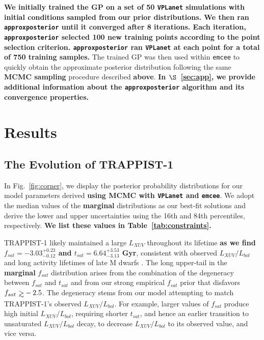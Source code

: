 \documentclass[twocolumn]{aastex62}
\def\gsim{~\rlap{$>$}{\lower 1.0ex\hbox{$\sim$}}}
\newcommand{\xxx}[1]{{\textbf{#1}}}
\newcommand{\vplanet}[0]{\texttt{VPLanet}\xspace}
\newcommand{\emcee}[0]{\texttt{emcee}\xspace}
\newcommand{\approxposterior}[0]{\texttt{approxposterior}\xspace}
\begin{document}
\xxx{We initially trained the GP on a set of 50 \vplanet simulations with initial conditions sampled from our prior distributions. We then ran \approxposterior until it converged after 8 iterations. Each iteration, \approxposterior selected 100 new training points according to the \citet{Kandasamy2017} point selection criterion. \approxposterior ran \vplanet at each point for a total of 750 training samples.} The trained GP was then used within \emcee to quickly obtain the approximate posterior distribution following the same \xxx{MCMC sampling} procedure described \xxx{above}. \xxx{In $\S$~\ref{sec:app}, we provide additional information about the \approxposterior algorithm and its convergence properties.}


\section{Results} \label{sec:results}

\subsection{The Evolution of TRAPPIST-1}

In Fig.~\ref{fig:corner}, we display the posterior probability distributions for our model parameters derived \xxx{using MCMC with \vplanet and \emcee}. We adopt the median values of the \xxx{marginal} distributions as our best-fit solutions and derive the lower and upper uncertainties using the 16th and 84th percentiles, respectively. \xxx{We list these values in Table~\ref{tab:constraints}.}

TRAPPIST-1 likely maintained a large $L_{XUV}$ throughout its lifetime \xxx{as we find $f_{sat} = -3.03^{+0.23}_{-0.12}$ and $t_{sat} = 6.64^{+3.53}_{-3.13}$ Gyr}, consistent with observed $L_{XUV}/L_{bol}$ and long activity lifetimes of late M dwarfs \citep{West2008,Wright2018}. The long upper-tail in the \xxx{marginal} $f_{sat}$ distribution arises from the combination of the degeneracy between $f_{sat}$ and $t_{sat}$ and from our strong empirical $f_{sat}$ prior that disfavors $f_{sat} \gsim -2.5$. The degeneracy stems from our model attempting to match TRAPPIST-1's observed \xxx{$L_{XUV}/L_{bol}$}. For example, larger values of $f_{sat}$ produce high initial \xxx{$L_{XUV}/L_{bol}$}, requiring shorter $t_{sat}$, and hence an earlier transition to unsaturated \xxx{$L_{XUV}/L_{bol}$} decay, to decrease \xxx{$L_{XUV}/L_{bol}$} to its observed value, and vice versa. 
\end{document}
